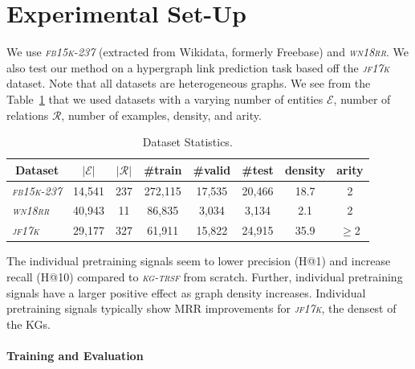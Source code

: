 \documentclass{article}
\newcommand{\kgtrsf}{\textsl{\textsc{kg-trsf}}\xspace}
\newcommand{\wnrr}{\textsl{\textsc{wn18rr}}\xspace}
\newcommand{\fb}{\textsl{\textsc{fb15k-237}}\xspace}
\newcommand{\jf}{\textsl{\textsc{jf17k}}\xspace}
\begin{document}
\section{Experimental Set-Up}
\label{app:setup}


We use \fb \cite{freebase} (extracted from Wikidata, formerly Freebase) and \wnrr \cite{wn18rr}. 
We also test our method on a hypergraph link prediction task based off the \jf \cite{jf17k} dataset. 
Note that all datasets are heterogeneous graphs.
We see from the Table~\ref{tab:data} that we used datasets with a varying number of entities $\mathcal{E}$, number of relations $\mathcal{R}$, number of examples, density, and arity.

\begin{table}[H]
\small
\centering
\setlength{\tabcolsep}{2.5pt}
\begin{tabular}{@{} l| *7c @{}}
\multicolumn{1}{c|}{Dataset}& $|\mathcal{E}|$  & $|\mathcal{R}|$  & \#train  & \#valid & \#test & density & arity\\
\hline
 \fb & 14,541 & 237 & 272,115 & 17,535 & 20,466 & 18.7 & 2\\
 \wnrr & 40,943 & 11 & 86,835 & 3,034 & 3,134 & 2.1 & 2\\
 \hline
 \jf & 29,177 & 327 & 61,911 & 15,822 & 24,915 & 35.9 & $\ge$2\\
\end{tabular}
\caption{Dataset Statistics.}\label{tab:data}
\end{table}

The individual pretraining signals seem to lower precision (H@1) and increase recall (H@10) compared to \kgtrsf from scratch. 
Further, individual pretraining signals have a larger positive effect as graph density increases. 
Individual pretraining signals typically show MRR improvements for \jf, the densest of the KGs.

\paragraph{\textbf{Training and Evaluation}}
\end{document}
